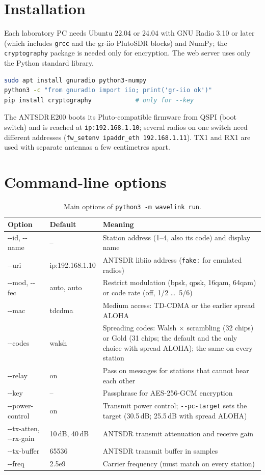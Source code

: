 \documentclass[11pt,a4paper,oneside]{report}
\newcommand{\code}[1]{\texttt{\small #1}}
\begin{document}
\section{Installation}
\noindent Each laboratory PC needs Ubuntu 22.04 or 24.04 with GNU Radio 3.10 or later (which includes \code{grcc}
and the gr-iio PlutoSDR blocks) and NumPy; the \code{cryptography} package is needed only for
encryption. The web server uses only the Python standard library.
\begin{lstlisting}[language=bash]
sudo apt install gnuradio python3-numpy
python3 -c "from gnuradio import iio; print('gr-iio ok')"
pip install cryptography            # only for --key
\end{lstlisting}
The ANTSDR\,E200 boots its Pluto-compatible firmware from QSPI (boot switch) and is reached at
\code{ip:192.168.1.10}; several radios on one switch need different addresses
(\code{fw\_setenv ipaddr\_eth 192.168.1.11}). TX1 and RX1 are used with separate antennas a few
centimetres apart.

\section{Command-line options}
\begin{table}[htbp]
\centering\small
\caption{Main options of \code{python3 -m wavelink run}.}\label{tab:flags}
\begin{tabularx}{\linewidth}{@{}>{\ttfamily\small}p{31mm}>{\ttfamily\small}p{31mm}L@{}}
\toprule
\textrm{\textbf{Option}} & \textrm{\textbf{Default}} & \textbf{Meaning}\\
\midrule
-{}-id, -{}-name & \textrm{--} & Station address (1--4, also its code) and display name\\
-{}-uri & ip:192.168.1.10 & ANTSDR libiio address (\code{fake:} for emulated radios)\\
-{}-mod, -{}-fec & auto, auto & Restrict modulation (bpsk, qpsk, 16qam, 64qam) or code rate (off, 1/2 \ldots\ 5/6)\\
-{}-mac & tdcdma & Medium access: TD-CDMA or the earlier spread ALOHA\\
-{}-codes & walsh & Spreading codes: Walsh $\times$ scrambling (32 chips) or Gold (31 chips; the default and the only choice with spread ALOHA); the same on every station\\
-{}-relay & on & Pass on messages for stations that cannot hear each other\\
-{}-key & \textrm{--} & Passphrase for AES-256-GCM encryption\\
-{}-power-control & on & Transmit power control; \code{-{}-pc-target} sets the target (30.5\,dB; 25.5\,dB with spread ALOHA)\\
-{}-tx-atten, -{}-rx-gain & 10\,dB, 40\,dB & ANTSDR transmit attenuation and receive gain\\
-{}-tx-buffer & 65536 & ANTSDR transmit buffer in samples\\
-{}-freq & 2.5e9 & Carrier frequency (must match on every station)\\
\bottomrule
\end{tabularx}
\end{table}
\end{document}
